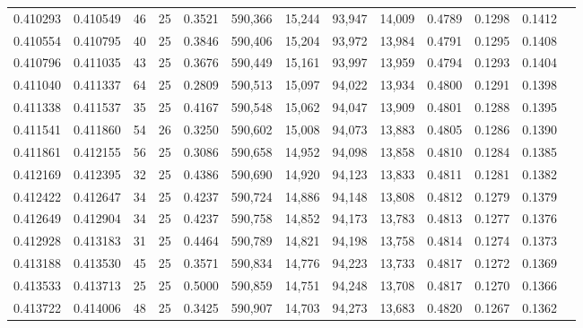 \begin{tabular}{rrrrrrrrrrrrr}
0.410293 & 0.410549 &    46 &  25 &                                     0.3521 & 590,366 &  15,244 &  93,947 &  14,009 & 0.4789 & 0.1298 & 0.1412 \\
0.410554 & 0.410795 &    40 &  25 &                                     0.3846 & 590,406 &  15,204 &  93,972 &  13,984 & 0.4791 & 0.1295 & 0.1408 \\
0.410796 & 0.411035 &    43 &  25 &                                     0.3676 & 590,449 &  15,161 &  93,997 &  13,959 & 0.4794 & 0.1293 & 0.1404 \\
0.411040 & 0.411337 &    64 &  25 &                                     0.2809 & 590,513 &  15,097 &  94,022 &  13,934 & 0.4800 & 0.1291 & 0.1398 \\
0.411338 & 0.411537 &    35 &  25 &                                     0.4167 & 590,548 &  15,062 &  94,047 &  13,909 & 0.4801 & 0.1288 & 0.1395 \\
0.411541 & 0.411860 &    54 &  26 &                                     0.3250 & 590,602 &  15,008 &  94,073 &  13,883 & 0.4805 & 0.1286 & 0.1390 \\
0.411861 & 0.412155 &    56 &  25 &                                     0.3086 & 590,658 &  14,952 &  94,098 &  13,858 & 0.4810 & 0.1284 & 0.1385 \\
0.412169 & 0.412395 &    32 &  25 &                                     0.4386 & 590,690 &  14,920 &  94,123 &  13,833 & 0.4811 & 0.1281 & 0.1382 \\
0.412422 & 0.412647 &    34 &  25 &                                     0.4237 & 590,724 &  14,886 &  94,148 &  13,808 & 0.4812 & 0.1279 & 0.1379 \\
0.412649 & 0.412904 &    34 &  25 &                                     0.4237 & 590,758 &  14,852 &  94,173 &  13,783 & 0.4813 & 0.1277 & 0.1376 \\
0.412928 & 0.413183 &    31 &  25 &                                     0.4464 & 590,789 &  14,821 &  94,198 &  13,758 & 0.4814 & 0.1274 & 0.1373 \\
0.413188 & 0.413530 &    45 &  25 &                                     0.3571 & 590,834 &  14,776 &  94,223 &  13,733 & 0.4817 & 0.1272 & 0.1369 \\
0.413533 & 0.413713 &    25 &  25 &                                     0.5000 & 590,859 &  14,751 &  94,248 &  13,708 & 0.4817 & 0.1270 & 0.1366 \\
0.413722 & 0.414006 &    48 &  25 &                                     0.3425 & 590,907 &  14,703 &  94,273 &  13,683 & 0.4820 & 0.1267 & 0.1362 \\

\end{tabular}
